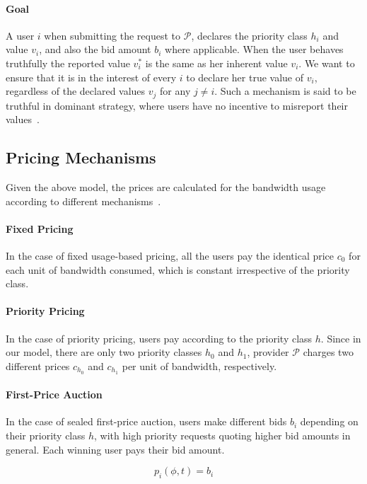 \paragraph{Goal} A user $i$ when submitting the request to $\mathcal{P}$, declares the priority class $h_i$ and value $v_i$, and also the bid amount $b_i$ where applicable.
When the user behaves truthfully the reported value $v^*_i$ is the same as her inherent value $v_i$.
We want to ensure that it is in the interest of every $i$ to declare her true value of $v_i$,
regardless of the declared values $v_j$ for any $j \neq i$. 
Such a mechanism is said to be truthful in dominant strategy,
where users have no incentive to misreport their values~\cite{Nisan2001}.


\subsection{Pricing Mechanisms}
\label{sec:model-pricing}
Given the above model, the prices are calculated for the bandwidth usage according to different mechanisms~\cite{Maille2014}.

\paragraph{Fixed Pricing}
In the case of fixed usage-based pricing, all the users pay the identical price $c_0$ for each unit of bandwidth consumed, which is constant irrespective of the priority class.

\paragraph{Priority Pricing}
In the case of priority pricing, users pay according to the priority class $h$. 
Since in our model, there are only two priority classes $h_0$ and $h_1$, provider $\mathcal{P}$ charges two different prices $c_{h_0}$ and $c_{h_1}$ per unit of bandwidth, respectively.

\paragraph{First-Price Auction}
In the case of sealed first-price auction, users make different bids $b_i$ depending on their priority class $h$, with high priority requests quoting higher bid amounts in general. 
Each winning user pays their bid amount.

\begin{equation}
	p_i(\phi, t) = b_i
\end{equation}



